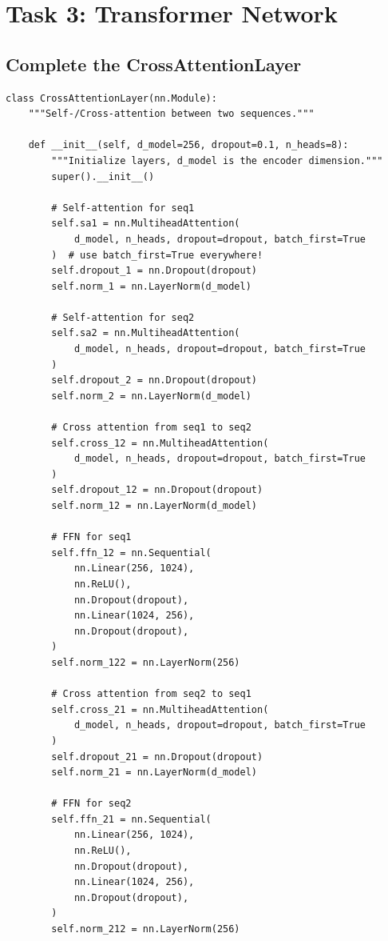 \documentclass{article}
\begin{document}
\setcounter{section}{3}
\section*{Task 3: Transformer Network}

\setcounter{subsection}{0}
\subsection{Complete the CrossAttentionLayer}
\begin{lstlisting}
class CrossAttentionLayer(nn.Module):
    """Self-/Cross-attention between two sequences."""

    def __init__(self, d_model=256, dropout=0.1, n_heads=8):
        """Initialize layers, d_model is the encoder dimension."""
        super().__init__()

        # Self-attention for seq1
        self.sa1 = nn.MultiheadAttention(
            d_model, n_heads, dropout=dropout, batch_first=True
        )  # use batch_first=True everywhere!
        self.dropout_1 = nn.Dropout(dropout)
        self.norm_1 = nn.LayerNorm(d_model)

        # Self-attention for seq2
        self.sa2 = nn.MultiheadAttention(
            d_model, n_heads, dropout=dropout, batch_first=True
        )
        self.dropout_2 = nn.Dropout(dropout)
        self.norm_2 = nn.LayerNorm(d_model)

        # Cross attention from seq1 to seq2
        self.cross_12 = nn.MultiheadAttention(
            d_model, n_heads, dropout=dropout, batch_first=True
        )
        self.dropout_12 = nn.Dropout(dropout)
        self.norm_12 = nn.LayerNorm(d_model)

        # FFN for seq1
        self.ffn_12 = nn.Sequential(
            nn.Linear(256, 1024),
            nn.ReLU(),
            nn.Dropout(dropout),
            nn.Linear(1024, 256),
            nn.Dropout(dropout),
        )
        self.norm_122 = nn.LayerNorm(256)

        # Cross attention from seq2 to seq1
        self.cross_21 = nn.MultiheadAttention(
            d_model, n_heads, dropout=dropout, batch_first=True
        )
        self.dropout_21 = nn.Dropout(dropout)
        self.norm_21 = nn.LayerNorm(d_model)

        # FFN for seq2
        self.ffn_21 = nn.Sequential(
            nn.Linear(256, 1024),
            nn.ReLU(),
            nn.Dropout(dropout),
            nn.Linear(1024, 256),
            nn.Dropout(dropout),
        )
        self.norm_212 = nn.LayerNorm(256)


\end{lstlisting}
\end{document}
